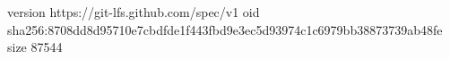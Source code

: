 version https://git-lfs.github.com/spec/v1
oid sha256:8708dd8d95710e7cbdfde1f443fbd9e3ec5d93974c1c6979bb38873739ab48fe
size 87544
